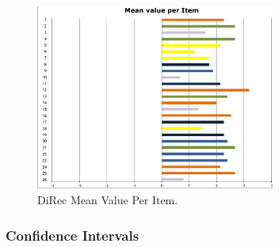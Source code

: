 \begin{figure}[t]
\centering
\includegraphics[width=0.7\textwidth]{figures/direc-results3}
\caption{DiRec Mean Value Per Item.}
\label{fig:figure510}
\end{figure}

\subsubsection{Confidence Intervals}


